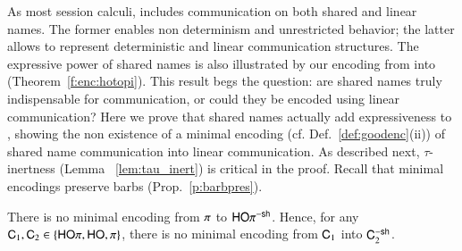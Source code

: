 \noi As most session calculi, 
\HOp includes communication on both shared and linear names.
The former enables non determinism and unrestricted behavior; the latter allows to represent
deterministic and linear communication structures.
The expressive power of shared names is also illustrated by our 
encoding from \HOp into \sessp (Theorem~\ref{f:enc:hotopi}).
This result begs the question: are shared names truly indispensable for communication, or could they
be encoded using linear communication?
Here we prove that shared names actually add expressiveness to \HOp,
showing 
the non existence of a minimal encoding 
(cf. Def.~\ref{def:goodenc}(ii))
of shared name communication into linear 
communication. 
As described next, 
$\tau$-inertness (Lemma ~\ref{lem:tau_inert}) is critical in the proof.
Recall that minimal encodings preserve barbs (Prop.~\ref{p:barbpres}).

\begin{theorem}\rm
There is no %
minimal
encoding 
from $\pi$ to $\mathsf{HO}\pi^{\mathsf{-sh}}$. Hence, 
for any $\mathsf{C}_1,\mathsf{C}_2\in \{ \mathsf{HO}\pi, \mathsf{HO}, \pi\}$, 
there is no 
minimal
encoding from $\mathsf{C}_1$ into $\mathsf{C}_2^{-\mathsf{sh}}$.  
\end{theorem}


